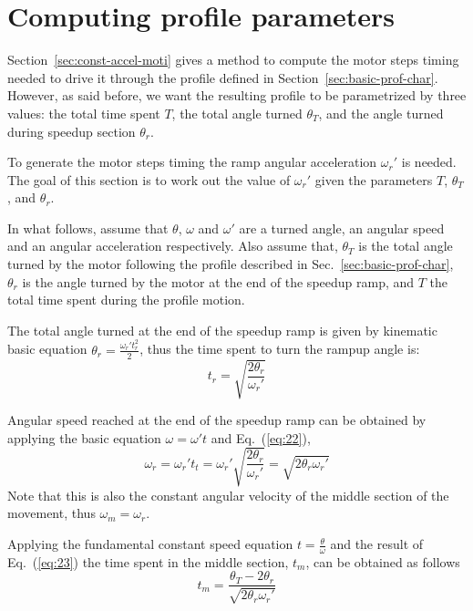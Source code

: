 \documentclass[a4paper]{article}
\begin{document}
\section{Computing profile parameters}
\label{sec:comp-prof-param}


Section~\ref{sec:const-accel-moti} gives a method to compute the motor
steps timing needed to drive it through the profile defined in
Section~\ref{sec:basic-prof-char}. However, as said before, we want the
resulting profile to be parametrized by three values: the total time
spent $T$, the total angle turned $\theta_T$, and the angle turned
during speedup section $\theta_r$.

To generate the motor steps timing
the ramp angular acceleration $\omega_r'$ is needed. The goal of this
section is to work out the value of $\omega_r'$ given the parameters
$T$, $\theta_T$, and $\theta_r$.

In what follows, assume that $\theta$, $\omega$ and $\omega'$ are a
turned angle, an angular speed and an angular acceleration
respectively.
%
Also assume that, $\theta_T$ is the total angle turned by the motor
following the profile described in Sec.~\ref{sec:basic-prof-char},
$\theta_r$ is the angle turned by the motor at the end of the speedup
ramp, and $T$ the total time spent during the profile motion.


The total angle turned at the end of the speedup ramp is given by
kinematic basic equation $\theta_r=\frac{\omega_r' t_r^2}{2}$, thus the time
spent to turn the rampup angle is:
\begin{equation}
  \label{eq:22}
  t_r = \sqrt{\frac{2\theta_r}{\omega_r'}}
\end{equation}

Angular speed reached at the end of the speedup ramp can be obtained
by applying the basic equation $\omega=\omega' t$ and
Eq.~(\ref{eq:22}),
\begin{equation}
  \label{eq:23}
  \omega_r=\omega_r' t_t= \omega_r' \sqrt{\frac{2\theta_r}{\omega_r'}} = \sqrt{2\theta_r\omega_r'}
\end{equation}
Note that this is also the constant angular velocity of the middle
section of the movement, thus $\omega_m = \omega_r$.

Applying the fundamental constant speed equation
$t=\frac{\theta}{\omega}$ and the result of Eq.~(\ref{eq:23}) the time
spent in the middle section, $t_m$, can be obtained as follows
\begin{equation}
  \label{eq:24}
  t_m = \frac{\theta_T-2\theta_r}{\sqrt{2\theta_r\omega_r'}}
\end{equation}
\end{document}
